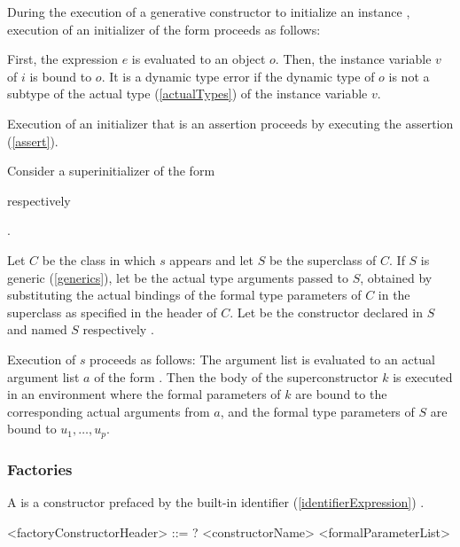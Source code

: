 \documentclass[makeidx]{article}
\begin{document}
\LMHash{}%
During the execution of a generative constructor to initialize an instance
,
execution of an initializer of the form 
proceeds as follows:

\LMHash{}%
First, the expression $e$ is evaluated to an object $o$.
Then, the instance variable $v$ of $i$ is bound to $o$.
It is a dynamic type error if the dynamic type of $o$ is not
a subtype of the actual type
(\ref{actualTypes})
of the instance variable $v$.

\LMHash{}%
Execution of an initializer that is an assertion proceeds by
executing the assertion (\ref{assert}).

\LMHash{}%
Consider a superinitializer  of the form

\noindent
\code{\SUPER(\ArgumentListStd)}
respectively

\noindent
{}.

\LMHash{}%
%
Let $C$ be the class in which $s$ appears and let $S$ be the superclass of $C$.
If $S$ is generic (\ref{generics}),
let  be the actual type arguments passed to $S$,
obtained by substituting the actual bindings 
of the formal type parameters of $C$
in the superclass as specified in the header of $C$.
Let  be the constructor declared in $S$ and named
$S$ respectively .

\LMHash{}%
Execution of $s$ proceeds as follows:
The argument list
\code{(\ArgumentListStd)}
is evaluated to an actual argument list $a$ of the form
.
Then the body of the superconstructor $k$ is executed
in an environment where the formal parameters of $k$ are bound to
the corresponding actual arguments from $a$,
and the formal type parameters of $S$ are bound to $u_1, \ldots, u_p$.


\subsubsection{Factories}

\LMHash{}%
A 
is a constructor prefaced by the built-in identifier
(\ref{identifierExpression})
\FACTORY.

\begin{grammar}
<factoryConstructorHeader> ::= \gnewline{}
  \CONST? \FACTORY{} <constructorName> <formalParameterList>
\end{grammar}
\end{document}
